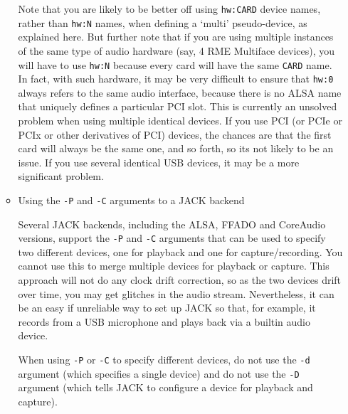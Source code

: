 \documentclass[10pt,a4paper]{book}
\begin{document}
\begin{enumerate}
\begin{itemize}
Note that you are likely to be better off using \texttt{hw:CARD} device names,
rather than \texttt{hw:N} names, when defining a `multi' pseudo-device, as
explained here. But further note that if you are using multiple
instances of the same type of audio hardware (say, 4 RME Multiface
devices), you will have to use \texttt{hw:N} because every card will have the
same \texttt{CARD} name. In fact, with such hardware, it may be very
difficult to ensure that \texttt{hw:0} always refers to the same audio
interface, because there is no ALSA name that uniquely defines a
particular PCI slot. This is currently an unsolved problem when using
multiple identical devices. If you use PCI (or PCIe or PCIx or other
derivatives of PCI) devices, the chances are that the first card will
always be the same one, and so forth, so its not likely to be an
issue. If you use several identical USB devices, it may be a more
significant problem.

\item Using the \texttt{-P} and \texttt{-C} arguments to a JACK backend

Several JACK backends, including the ALSA, FFADO and CoreAudio
versions, support the \texttt{-P} and \texttt{-C} arguments that can
be used to specify two different devices, one for playback and one for
capture/recording. You cannot use this to merge multiple devices for
playback or capture. This approach will not do any clock drift
correction, so as the two devices drift over time, you may get
glitches in the audio stream. Nevertheless, it can be an easy if
unreliable way to set up JACK so that, for example, it records from a
USB microphone and plays back via a builtin audio device.

When using \texttt{-P} or \texttt{-C} to specify different devices, do
not use the \texttt{-d} argument (which specifies a single device) and
do not use the \texttt{-D} argument (which tells JACK to configure a
device for playback and capture).

\end{itemize}
\end{enumerate}


\printindex
\end{document}
